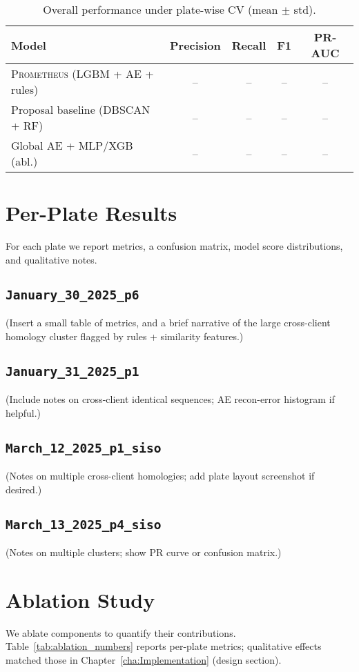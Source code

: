 \begin{table}[H]\centering
\caption{Overall performance under plate-wise CV (mean $\pm$ std).}
\label{tab:overall_metrics}
\begin{tabular}{|l|c|c|c|c|}
\hline
Model & Precision & Recall & F1 & PR-AUC \\ \hline
\textsc{Prometheus} (LGBM + AE + rules) & -- & -- & -- & -- \\ \hline
Proposal baseline (DBSCAN + RF) & -- & -- & -- & -- \\ \hline
Global AE + MLP/XGB (abl.) & -- & -- & -- & -- \\ \hline
\end{tabular}
\end{table}

\section{Per-Plate Results}
\label{sec:per_plate}
For each plate we report metrics, a confusion matrix, model score distributions, and qualitative notes.

\subsection{\texttt{January\_30\_2025\_p6}}
(Insert a small table of metrics, and a brief narrative of the large cross-client homology cluster flagged by rules + similarity features.)

\subsection{\texttt{January\_31\_2025\_p1}}
(Include notes on cross-client identical sequences; AE recon-error histogram if helpful.)

\subsection{\texttt{March\_12\_2025\_p1\_siso}}
(Notes on multiple cross-client homologies; add plate layout screenshot if desired.)

\subsection{\texttt{March\_13\_2025\_p4\_siso}}
(Notes on multiple clusters; show PR curve or confusion matrix.)

\section{Ablation Study}
\label{sec:ablation}
We ablate components to quantify their contributions. Table~\ref{tab:ablation_numbers} reports per-plate metrics; qualitative effects matched those in Chapter~\ref{cha:Implementation} (design section).


